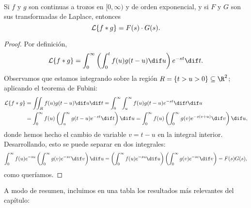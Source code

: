 \documentclass[../main.tex]{subfiles}
\begin{document}
\begin{theorem}
  Si \(f\) y \(g\) son continuas a trozos en \([0,\infty)\) y de orden
  exponencial, y si \(F\) y \(G\) son sus transformadas de Laplace, entonces
  \[\mathcal{L}\{f \ast g\} = F(s) \cdot G(s).\]
  \begin{proof}
    Por definición,
    \[\L\{f \ast g\} = \int_0^\infty \left( \int_0^t f(u)g(t-u) \dif u \right)
      e^{-st} \dif t.\]
    Observamos que estamos integrando sobre la región \(R = \{t > u > 0\} \subseteq
    \R^2\); aplicando el teorema de Fubini:
    \begin{align*}
      \L\{f \ast g\} &= \iint_R f(u) g(t-u) \dif u \dif t = \int_0^\infty
      \int_u^\infty f(u)g(t-u)e^{-st} \dif t \dif u \\
      &= \int_0^\infty f(u) \left( \int_u^\infty g(t-u)e^{-st} \dif t \right)
      \dif u = \int_0^\infty f(u) \left( \int_0^\infty g(v)e^{-s(v+u)} \dif v
        \right) \dif u,
    \end{align*}
    donde hemos hecho el cambio de variable \(v = t-u\) en la integral
    interior. Desarrollando, esto se puede separar en dos integrales:
    \[\int_0^\infty f(u) e^{-su} \left( \int_0^\infty g(v)e^{-sv} \dif v \right) \dif u =
      \left( \int_0^\infty f(u)e^{-su} \dif u \right)
      \left( \int_0^\infty g(v)e^{-sv} \dif v \right) =
      F(s) G(s),\]
    como queríamos.
  \end{proof}
\end{theorem}

A modo de resumen, incluimos en una tabla los resultados más relevantes del
capítulo:
\end{document}
